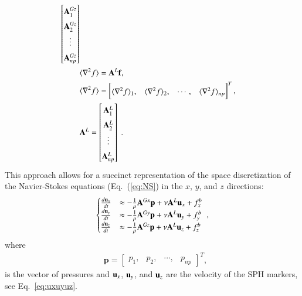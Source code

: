 \documentclass[final,3p,times]{elsarticle}
\begin{document}
\begin{align}
\begin{bmatrix}
\mathbf{A}^{Gz}_1\\\mathbf{A}^{Gz}_2\\\vdots\\\mathbf{A}^{Gz}_{np}
\end{bmatrix}\\
&\langle \nabla^2 f \rangle=\mathbf{A}^L\mathbf{f},\label{eq:laplace_op}\\
&\langle \nabla^2 f \rangle= \begin{bmatrix}
\langle \nabla^2 f \rangle_1,&\langle \nabla^2 f \rangle_2,&\cdots,&\langle \nabla^2 f \rangle_{np}
\end{bmatrix}^T,\\
&\mathbf{A}^L=  \renewcommand*{\arraystretch}{1.5}
\begin{bmatrix}
\mathbf{A}^L_1\\\mathbf{A}^L_2\\\vdots\\\mathbf{A}^L_{np}
\end{bmatrix} \; .
\end{align}
This approach allows for a succinct representation of the space discretization of the Navier-Stokes equations (Eq.~(\eqref{eq:NS}) in the $x$, $y$, and $z$ directions:  
\begin{align}
\begin{cases}
\frac{d{\bf u}_x}{dt} & \approx -\frac{1}{\rho} \mathbf{A}^{Gx}\mathbf{p} + \nu \mathbf{A}^L{\bf u}_x+{ f}_x^b\\
\frac{d{\bf u}_y}{dt} & \approx -\frac{1}{\rho} \mathbf{A}^{Gy}\mathbf{p} + \nu \mathbf{A}^L{\bf u}_y+{ f}_y^b\\
\frac{d{\bf u}_z}{dt} & \approx -\frac{1}{\rho} \mathbf{A}^{Gz}\mathbf{p} + \nu \mathbf{A}^L{\bf u}_z+{ f}_z^b
\end{cases}\label{eq:NS_discretized} \; ,
\end{align}
where 
\begin{align}
&\mathbf{p}= \begin{bmatrix}
p_{1},&p_{2},&\cdots,&p_{np}
\end{bmatrix}^T,\label{eq:pres_vec}
\end{align} 
is the vector of pressures and ${\bf u}_x$, ${\bf u}_y$, and ${\bf u}_z$ are the velocity of the SPH markers, see Eq.~\eqref{eq:uxuyuz}.
\end{document}
